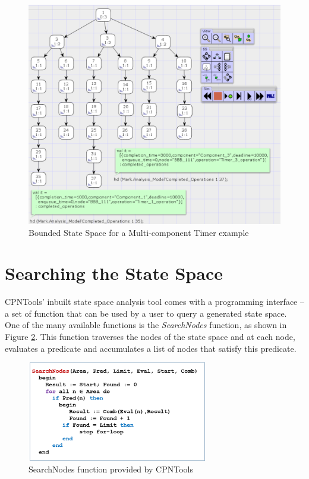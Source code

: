\begin{figure}[htb]
	\centering
	\includegraphics[width=\textwidth]{./img/state-space-analysis.png}
	\caption{Bounded State Space for a Multi-component Timer example}
	\label{fig:SSScreenshot}
\end{figure}
\FloatBarrier

\section{Searching the State Space}

CPNTools' inbuilt state space analysis tool comes with a programming interface -- a set of function that can be used by a user to query a generated state space. One of the many available functions is the \emph{SearchNodes} function, as shown in Figure \ref{fig:SSSearching}. This function traverses the nodes of the state space and at each node, evaluates a predicate and accumulates a list of nodes that satisfy this predicate. 

\begin{figure}[htb]
	\centering
	\includegraphics[width=0.7\textwidth]{./img/state-space-searching.png}
	\caption{SearchNodes function provided by CPNTools}
	\label{fig:SSSearching}
\end{figure}
\FloatBarrier

